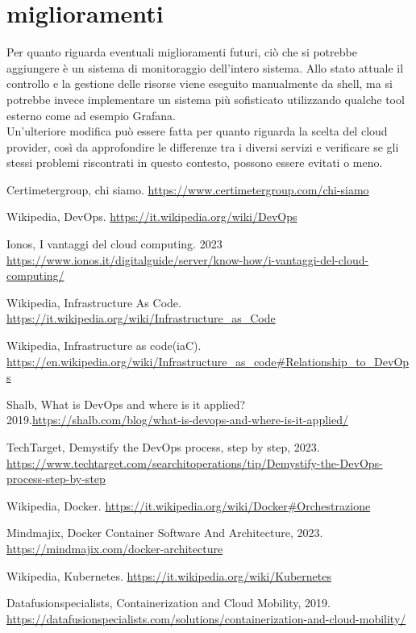 \documentclass[a4paper,12pt]{report}
\begin{document}
\section{miglioramenti}
Per quanto riguarda eventuali miglioramenti futuri, ciò che si potrebbe aggiungere è un sistema di monitoraggio dell'intero sistema. Allo stato attuale il controllo e la gestione delle risorse viene eseguito manualmente da shell, ma si potrebbe invece implementare un sistema più sofisticato utilizzando qualche tool esterno come ad esempio Grafana.\\
Un'ulteriore modifica può essere fatta per quanto riguarda la scelta del cloud provider, così da approfondire le differenze tra i diversi servizi e verificare se gli stessi problemi riscontrati in questo contesto, possono essere evitati o meno.
%
%
\begin{thebibliography}{00}
%

Certimetergroup, chi siamo. \url{https://www.certimetergroup.com/chi-siamo}

Wikipedia, DevOps. \url{https://it.wikipedia.org/wiki/DevOps}

Ionos, I vantaggi del cloud computing. 2023 \url{https://www.ionos.it/digitalguide/server/know-how/i-vantaggi-del-cloud-computing/}


Wikipedia, Infrastructure As Code. \url{https://it.wikipedia.org/wiki/Infrastructure_as_Code}

Wikipedia, Infrastructure as code(iaC). \url{https://en.wikipedia.org/wiki/Infrastructure_as_code#Relationship_to_DevOps}

Shalb, What is DevOps and where is it applied? 2019.\url{https://shalb.com/blog/what-is-devops-and-where-is-it-applied/}


TechTarget, Demystify the DevOps process, step by step, 2023. \url{https://www.techtarget.com/searchitoperations/tip/Demystify-the-DevOps-process-step-by-step}

Wikipedia, Docker. \url{https://it.wikipedia.org/wiki/Docker#Orchestrazione}

Mindmajix, Docker Container Software And Architecture, 2023. \url{https://mindmajix.com/docker-architecture}

Wikipedia, Kubernetes. \url{https://it.wikipedia.org/wiki/Kubernetes}

Datafusionspecialists, Containerization and Cloud Mobility, 2019. \url{https://datafusionspecialists.com/solutions/containerization-and-cloud-mobility/}


\end{thebibliography}
\end{document}
